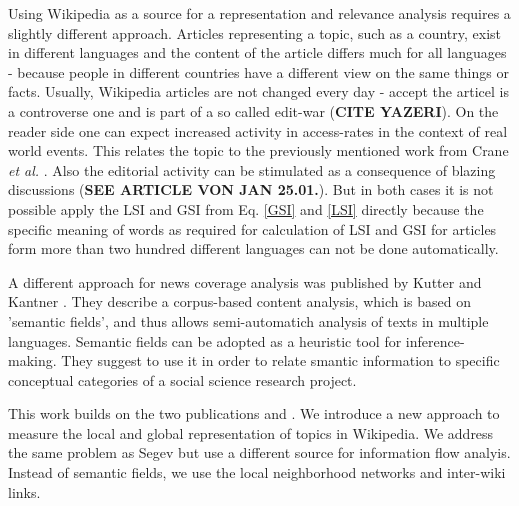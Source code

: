 \documentclass[a4paper,10pt]{scrbook}
\begin{document}
Using Wikipedia as a source for a representation and relevance analysis requires a slightly different approach. Articles representing a topic, such as a country, exist in different languages and the content of the article differs much for all languages - because people in different countries have a different view on the same things or facts. Usually, Wikipedia articles are not changed every day - accept the articel is a controverse one and is part of a so called edit-war (\textbf{CITE YAZERI}). On the reader side one can expect increased activity in access-rates in the context of real world events. This relates the topic to the previously mentioned work from Crane  \textit{et al.} \cite{Crane2008}. Also the editorial activity can be stimulated as a consequence of blazing discussions (\textbf{SEE ARTICLE VON JAN 25.01.}). But in both cases it is not possible apply the LSI and GSI from Eq. \ref{GSI} and \ref{LSI} directly because the specific meaning of words as required for calculation of LSI and GSI for articles form more than two hundred different languages can not be done automatically. 

A different approach for news coverage analysis was published by Kutter and Kantner \cite{kutter2012corpus}. They describe a corpus-based content analysis, which is based on 'semantic fields', and thus allows semi-automatich analysis of texts in multiple languages. Semantic fields can be adopted as a heuristic tool for inference-making. They suggest to use it in order to relate smantic information to specific conceptual categories of a social science research project. 

This work builds on the two publications \cite{Segev2010} and \cite{kutter2012corpus}. We introduce a new approach to measure the local and global representation of topics in Wikipedia. We address the same problem as Segev but use a different source for information flow analyis. Instead of semantic fields, we use the local neighborhood networks and inter-wiki links. 

%
%
\end{document}
